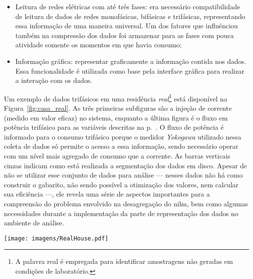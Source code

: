 \begin{itemize}
algoritmos já que a leitura em disco é lenta;
\item Leitura de redes elétricas com até três fases: era necessário
compatibilidade de leitura de dados de redes monofásicas, bifásicas e
trifásicas, representando essa informação de uma maneira universal. Um
dos fatores que influênciou também na compressão dos dados foi armazenar
para as fases com pouca atividade somente os momentos em que havia
consumo;
\item Informação gráfica: representar graficamente a informação contida
nos dados. Essa funcionalidade é utilizada como base pela interface
gráfica para realizar a interação com os dados.
\end{itemize}

Um exemplo de dados trifásicos em uma residência
\emph{real}\footnote{A palavra real é empregada para identificar
amostragens não geradas em condições de laboratório.} está
disponível na Figura~\ref{fig:casa_real}. As três primeiras subfiguras
são a injeção de corrente (medido em valor eficaz) no sistema,
enquanto a última figura é o fluxo em potência trifásico para as
variáveis descritas na p.~\pageref{eq:ipqds}. O fluxo de potência é
informado para o consumo trifásico porque o medidor \emph{Yokogawa}
utilizado nessa coleta de dados só permite o acesso a essa informação,
sendo necessário operar com um nível mais agregado de consumo que a
corrente. As barras verticais cinzas indicam como está realizada a
segmentação dos dados em disco. Apesar de não se utilizar esse
conjunto de dados para análise --- nesses dados não há como construir
o gabarito, não sendo possível a otimização dos valores, nem calcular
sua eficiência ---, ele revela uma série de aspectos importantes para
a compreensão do problema envolvido na desagregação do \gls{nilm}, bem
como algumas necessidades durante a implementação da parte de
representação dos dados no ambiente de análise. 

\begin{sidewaysfigure}[p]
\centering
\texttt{[image: imagens/RealHouse.pdf]}
\caption[Informação gráfica para o interação com dados do medidor]
{Informação gráfica para a interação com os dados do medidor. Gráfico
gerado através do ambiente de análise para um conjunto de dados com
amostragem em 60~\acs{hz} de uma rede trifásica em uma casa
\emph{real} durante aproximadamente um dia de coleta. A injeção de
corrente para cada uma das três fases encontra-se nas subfiguras
superiores, enquanto o fluxo trifásico de potência entrando na rede
elétrica é representado na subfigura inferior. São utilizados as cores
azul, vermelho, verde e preto para as potências ativa, reativa,
harmônica e aparente, respectivamente.}
\label{fig:casa_real}
\end{sidewaysfigure}

